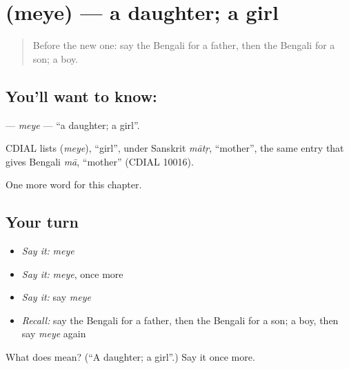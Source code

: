 \section[\texorpdfstring{\bn{মেয়ে} (meye)}{মেয়ে (meye)}]{ (meye) — a daughter; a girl}

\label{lesson:BN-C45-meye}



\begin{quote}
Before the new one: say the Bengali for a father, then the Bengali for a son; a boy.
\end{quote}

\subsection*{You'll want to know: }
\textbf{} — \emph{meye} — \textquotedblleft{}a daughter; a girl\textquotedblright{}.

\begin{cousinweb}
CDIAL lists \textbf{} (\emph{meye}), \textquotedblleft{}girl\textquotedblright{}, under Sanskrit \emph{mātṛ}, \textquotedblleft{}mother\textquotedblright{}, the same entry that gives Bengali \emph{mā}, \textquotedblleft{}mother\textquotedblright{} (CDIAL 10016).
\end{cousinweb}

\begin{grammarlens}[title={What you've built}]
One more word for this chapter.
\end{grammarlens}

\subsection*{Your turn}
\begin{itemize}
\raggedright
  \item \emph{Say it:} \emph{meye}
  \item \emph{Say it:} \emph{meye}, once more
  \item \emph{Say it:} say \emph{meye}
  \item \emph{Recall:} say the Bengali for a father, then the Bengali for a son; a boy, then say \emph{meye} again
\end{itemize}

\begin{tcolorbox}[breakable,colback=teal!4,colframe=teal!35!black,title={Before you move on}]
What does  mean? (\textquotedblleft{}A daughter; a girl\textquotedblright{}.) Say it once more.
\end{tcolorbox}
